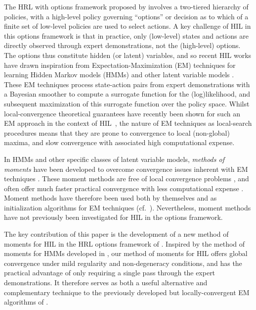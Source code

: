 The HRL with options framework proposed by \citet{SUTTON1999181} involves a two-tiered hierarchy of policies, with a high-level policy governing ``options'' or decision as to which of a finite set of low-level policies are used to select actions.
A key challenge of HIL in this options framework is that in practice, only (low-level) states and actions are directly observed through expert demonstrations, not the (high-level) options.
The options thus constitute hidden (or latent) variables, and so recent HIL works have drawn inspiration from Expectation-Maximization (EM) techniques for learning Hidden Markov models (HMMs) and other latent variable models \citep{Daniel2016,zhiyu20,Giammarino_2021}.
These EM techniques process state-action pairs from expert demonstrations with a Bayesian smoother to compute a surrogate function for the (log)likelihood, and subsequent maximization of this surrogate function over the policy space.
Whilst local-convergence theoretical guarantees have recently been shown for such an EM approach in the context of HIL~\citep{zhiyu20}, the nature of EM techniques as local-search procedures means that they are prone to convergence to local (non-global) maxima, and slow convergence with associated high computational expense.

In HMMs and other specific classes of latent variable models, \emph{methods of moments} have been developed to overcome convergence issues inherent with EM techniques \citep{hsu08,HsuKakade13,Mattila2020,Mattila2015,Mattila2017,Anandkumar2014,Parikh2012}.
These moment methods are free of local convergence problems \citep{Mattila2020,Anandkumar2014}, and often offer much faster practical convergence with less computational expense \citep{Mattila2015,Mattila2017}.
Moment methods have therefore been used both by themselves and as initialization algorithms for EM techniques (cf.~\citep{Zhang2016}).
Nevertheless, moment methods have not previously been investigated for HIL in the options framework.

The key contribution of this paper is the development of a new method of moments for HIL in the HRL options framework of \citep{SUTTON1999181}. Inspired by the method of moments for HMMs developed in \citep{hsu08}, our method of moments for HIL offers global convergence under mild regularity and non-degeneracy conditions, and has the practical advantage of only requiring a single pass through the expert demonstrations.
It therefore serves as both a useful alternative and complementary technique to the previously developed but locally-convergent EM algorithms of \citep{Daniel2016,Giammarino_2021, zhiyu20}.

